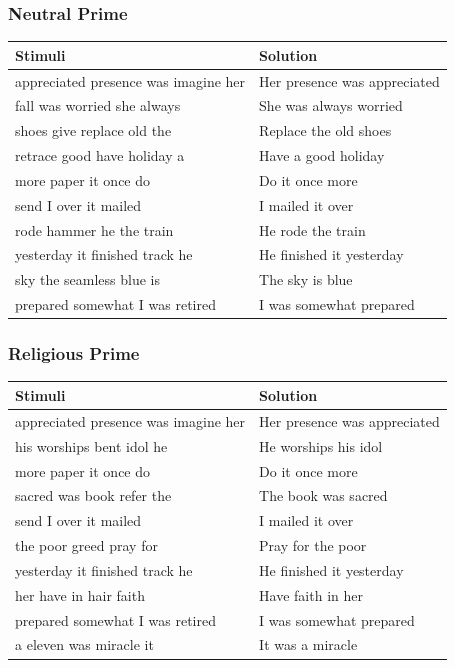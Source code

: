\documentclass[14pt]{beamer}
\newcommand\tb{\textbf}
\begin{document}
\begin{frame}
\frametitle{Neutral Prime}
\footnotesize
\begin{table}
	\centering
	\begin{tabular}{ll}
		\hline
		\tb{Stimuli}&\tb{Solution}\\
		\hline
		appreciated presence was imagine her&Her presence was appreciated\\
		fall was worried she always&She was always worried\\
		shoes give replace old the&Replace the old shoes\\
		retrace good have holiday a&Have a good holiday\\
		more paper it once do&Do it once more\\
		send I over it mailed&I mailed it over\\
		rode hammer he the train&He rode the train\\
		yesterday it finished track he&He finished it yesterday\\
		sky the seamless blue is&The sky is blue\\
		prepared somewhat I was retired&I was somewhat prepared\\
		\hline
	\end{tabular}
\end{table}
\end{frame}

\begin{frame}
\frametitle{Religious Prime}
\footnotesize
\begin{table}
	\centering
	\begin{tabular}{ll}
		\hline
		\tb{Stimuli}&\tb{Solution}\\
		\hline
		appreciated presence was imagine her&Her presence was appreciated\\
		his worships bent idol he&He worships his idol\\
		more paper it once do&Do it once more\\
		sacred was book refer the&The book was sacred\\
		send I over it mailed&I mailed it over\\
		the poor greed pray for&Pray for the poor\\
		yesterday it finished track he&He finished it yesterday\\
		her have in hair faith&Have faith in her\\
		prepared somewhat I was retired&I was somewhat prepared\\
		a eleven was miracle it&It was a miracle\\
		\hline
	\end{tabular}
\end{table}
\end{frame}
\end{document}
